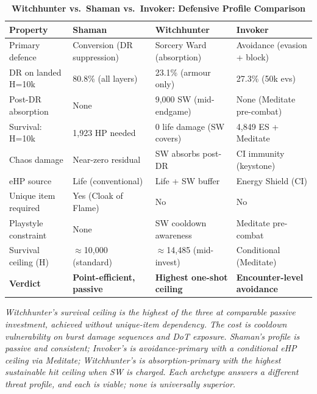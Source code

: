 \documentclass[12pt, letterpaper]{article}
\begin{document}
\begin{table}[htbp]
\centering
\caption{\textbf{Witchhunter vs.\ Shaman vs.\ Invoker: Defensive Profile Comparison}}
{\small
\begin{tabular}{llll}
\toprule
\textbf{Property} & \textbf{Shaman} & \textbf{Witchhunter} & \textbf{Invoker} \\
\midrule
\rowcolor{rowalt} Primary defence & Conversion (DR suppression) & Sorcery Ward (absorption) & Avoidance (evasion + block) \\
DR on landed H=10k & 80.8\% (all layers) & 23.1\% (armour only) & 27.3\% (50k evs) \\
\rowcolor{rowalt} Post-DR absorption & None & 9{,}000 SW (mid-endgame) & None (Meditate pre-combat) \\
Survival: H=10k & 1{,}923 HP needed & 0 life damage (SW covers) & 4{,}849 ES + Meditate \\
\rowcolor{rowalt} Chaos damage & Near-zero residual & SW absorbs post-DR & CI immunity (keystone) \\
eHP source & Life (conventional) & Life + SW buffer & Energy Shield (CI) \\
\rowcolor{rowalt} Unique item required & Yes (Cloak of Flame) & No & No \\
Playstyle constraint & None & SW cooldown awareness & Meditate pre-combat \\
\rowcolor{rowalt} Survival ceiling (H) & $\approx$10{,}000 (standard) & $\approx$14{,}485 (mid-invest) & Conditional (Meditate) \\
\rowcolor{rowhi} \textbf{Verdict} & \textbf{Point-efficient, passive} & \textbf{Highest one-shot ceiling} & \textbf{Encounter-level avoidance} \\
\bottomrule
\end{tabular}
}
\smallskip
\begin{minipage}{\linewidth}
\small\textit{Witchhunter's survival ceiling is the highest of the three at comparable passive investment, achieved without unique-item dependency. The cost is cooldown vulnerability on burst damage sequences and DoT exposure. Shaman's profile is passive and consistent; Invoker's is avoidance-primary with a conditional eHP ceiling via Meditate; Witchhunter's is absorption-primary with the highest sustainable hit ceiling when SW is charged. Each archetype answers a different threat profile, and each is viable; none is universally superior.}
\end{minipage}
\end{table}
\end{document}
